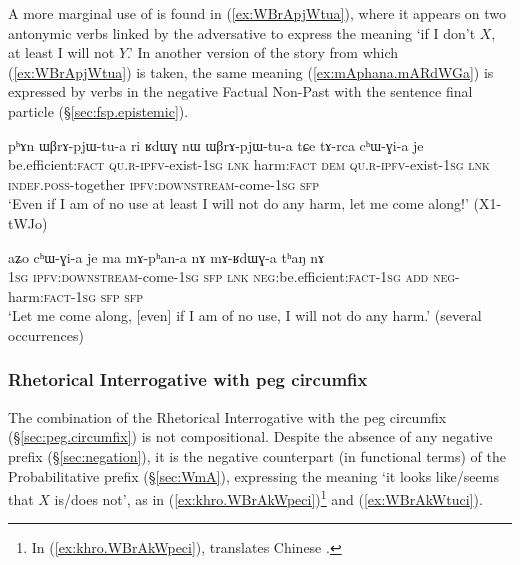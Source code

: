 A more marginal use of  is found in (\ref{ex:WBrApjWtua}), where it appears  on two antonymic verbs linked by the adversative  to express the meaning `if I don't $X$, at least I will not $Y$.' In another version of the story from which (\ref{ex:WBrApjWtua}) is taken, the same meaning (\ref{ex:mAphana.mARdWGa}) is expressed by verbs in the negative Factual Non-Past with the sentence final particle  (§\ref{sec:fsp.epistemic}).

 \begin{exe}
\ex \label{ex:WBrApjWtua}
\gll   pʰɤn ɯβrɤ-pjɯ-tu-a ri ʁdɯɣ nɯ ɯβrɤ-pjɯ-tu-a tɕe tɤ-rca cʰɯ-ɣi-a je \\
be.efficient:\textsc{fact} \textsc{qu}.\textsc{r}-\textsc{ipfv}-exist-\textsc{1sg} \textsc{lnk} harm:\textsc{fact} \textsc{dem} \textsc{qu}.\textsc{r}-\textsc{ipfv}-exist-\textsc{1sg}  \textsc{lnk} \textsc{indef}.\textsc{poss}-together \textsc{ipfv}:\textsc{downstream}-come-\textsc{1sg} \textsc{sfp} \\
\glt `Even if I am of no use at least I will not do any harm, let me come along!' (X1-tWJo)
\end{exe}

 \begin{exe}
\ex \label{ex:mAphana.mARdWGa}
\gll  aʑo cʰɯ-ɣi-a je ma mɤ-pʰan-a nɤ mɤ-ʁdɯɣ-a tʰaŋ nɤ \\
\textsc{1sg} \textsc{ipfv}:\textsc{downstream}-come-\textsc{1sg} \textsc{sfp} \textsc{lnk} \textsc{neg}:be.efficient:\textsc{fact}-\textsc{1sg} \textsc{add} \textsc{neg}-harm:\textsc{fact}-\textsc{1sg} \textsc{sfp} \textsc{sfp} \\
\glt `Let me come along, [even] if I am of no use, I will not do any harm.' (several occurrences)
\end{exe}

\subsubsection{Rhetorical Interrogative with peg circumfix} \label{sec:WBrA.kW.ci}
The combination of the Rhetorical Interrogative with the peg circumfix (§\ref{sec:peg.circumfix}) is not compositional. Despite the absence of any negative prefix (§\ref{sec:negation}), it is the negative counterpart (in functional terms) of the Probabilitative prefix (§\ref{sec:WmA}), expressing the meaning `it looks like/seems that $X$ is/does not', as in (\ref{ex:khro.WBrAkWpeci})\footnote{In (\ref{ex:khro.WBrAkWpeci}),  translates Chinese . } and (\ref{ex:WBrAkWtuci}).


